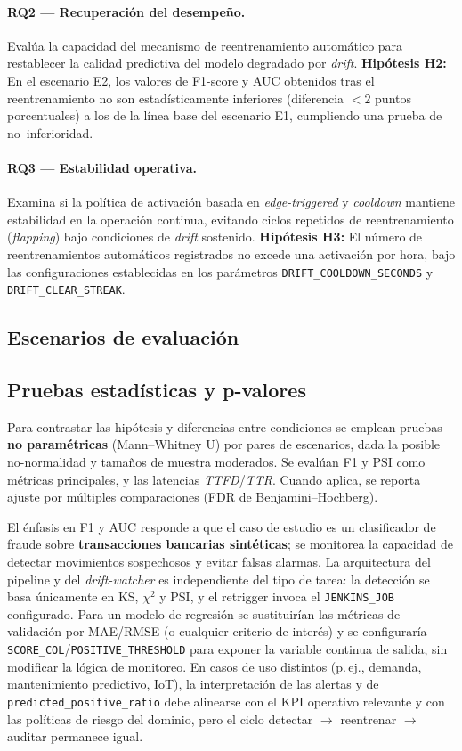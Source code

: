 \paragraph{RQ2 — Recuperación del desempeño.}
Evalúa la capacidad del mecanismo de reentrenamiento automático para restablecer la calidad predictiva del modelo degradado por \textit{drift}.  
\textbf{Hipótesis H2:} En el escenario E2, los valores de F1-score y AUC obtenidos tras el reentrenamiento no son estadísticamente inferiores (diferencia $<2$ puntos porcentuales) a los de la línea base del escenario E1, cumpliendo una prueba de no–inferioridad.

\paragraph{RQ3 — Estabilidad operativa.}
Examina si la política de activación basada en \textit{edge-triggered} y \textit{cooldown} mantiene estabilidad en la operación continua, evitando ciclos repetidos de reentrenamiento (\textit{flapping}) bajo condiciones de \textit{drift} sostenido.  
\textbf{Hipótesis H3:} El número de reentrenamientos automáticos registrados no excede una activación por hora, bajo las configuraciones establecidas en los parámetros \texttt{DRIFT\_COOLDOWN\_SECONDS} y \texttt{DRIFT\_CLEAR\_STREAK}.


\subsection{Escenarios de evaluación}
\label{subsec:eval-scenarios}

\subsection{Pruebas estadísticas y p-valores}
\label{subsec:eval-tests}
Para contrastar las hipótesis y diferencias entre condiciones se emplean pruebas \textbf{no paramétricas} (Mann–Whitney U) por pares de escenarios, dada la posible no-normalidad y tamaños de muestra moderados. Se evalúan F1 y PSI como métricas principales, y las latencias \textit{TTFD}/\textit{TTR}. Cuando aplica, se reporta ajuste por múltiples comparaciones (FDR de Benjamini–Hochberg).

El énfasis en F1 y AUC responde a que el caso de estudio es un clasificador de fraude sobre \textbf{transacciones bancarias sintéticas}; se monitorea la capacidad de detectar movimientos sospechosos y evitar falsas alarmas. La arquitectura del pipeline y del \textit{drift-watcher} es independiente del tipo de tarea: la detección se basa únicamente en KS, $\chi^2$ y PSI, y el retrigger invoca el \texttt{JENKINS\_JOB} configurado. Para un modelo de regresión se sustituirían las métricas de validación por MAE/RMSE (o cualquier criterio de interés) y se configuraría \texttt{SCORE\_COL}/\texttt{POSITIVE\_THRESHOLD} para exponer la variable continua de salida, sin modificar la lógica de monitoreo. En casos de uso distintos (p.\,ej., demanda, mantenimiento predictivo, IoT), la interpretación de las alertas y de \texttt{predicted\_positive\_ratio} debe alinearse con el KPI operativo relevante y con las políticas de riesgo del dominio, pero el ciclo detectar $\rightarrow$ reentrenar $\rightarrow$ auditar permanece igual.


